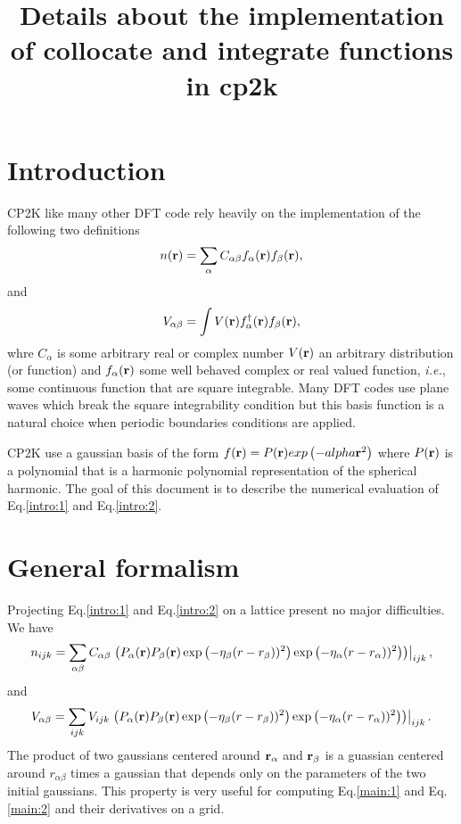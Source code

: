 \documentclass[prb]{revtex4}
\begin{document}
\title{Details about the implementation of collocate and integrate functions in cp2k}
\section{Introduction}
CP2K like many other DFT code rely heavily on the implementation of the following two definitions
\begin{equation}
  \label{intro:1}
  n({\bf r}) = \sum_{\alpha} C_{\alpha\beta} f_{\alpha}({\bf r}) f_{\beta}({\bf r}),
\end{equation}
and
\begin{equation}
  \label{intro:2}
  V_{\alpha\beta} = \int V({\bf r}) f^\dagger_\alpha({\bf r}) f_\beta({\bf r}),
\end{equation}
whre $C_{\alpha}$ is some arbitrary real or complex number $V({\bf r})$ an
arbitrary distribution (or function) and $f_\alpha({\bf r})$ some well behaved
complex or real valued function, {\it i.e.}, some continuous function that are
square integrable. Many DFT codes use plane waves which break the square
integrability condition but this basis function is a natural choice when
periodic boundaries conditions are applied.

CP2K use a gaussian basis of the form $f({\bf r}) = P({\bf r}) exp\left(-alpha
{\bf r}^2\right)$ where $P({\bf r})$ is a polynomial that is a harmonic polynomial
representation of the spherical harmonic. The goal of this document is to
describe the numerical evaluation of Eq.\ref{intro:1} and Eq.\ref{intro:2}.

\section{General formalism}
Projecting Eq.\ref{intro:1} and Eq.\ref{intro:2} on a lattice present no major difficulties.
We have
\begin{equation}
  \label{main:1}
  n_{ijk} = \sum_{\alpha\beta} C_{\alpha\beta} \left.\left(P_{\alpha}({\bf r})
  P_{\beta}({\bf r}) \exp\left(-\eta_{\beta} (r - r_{\beta}))^2\right)
  \exp\left(-\eta_{\alpha} (r - r_{\alpha}))^2\right)\right)\right| _{ijk},
\end{equation}
and
\begin{equation}
  \label{main:2}
  V_{\alpha\beta} = \sum_{ijk} V_{ijk} \left.\left(P_{\alpha}({\bf r})
  P_{\beta}({\bf r}) \exp\left(-\eta_{\beta} (r - r_{\beta}))^2\right)
  \exp\left(-\eta_{\alpha} (r - r_{\alpha}))^2\right)\right)\right| _{ijk}.
\end{equation}
The product of two gaussians centered around ${\bf r}_{\alpha}$ and ${\bf
  r}_{\beta}$ is a guassian centered around $r_{\alpha\beta}$ times a gaussian
that depends only on the parameters of the two initial gaussians. This property
is very useful for computing Eq.\ref{main:1} and Eq.\ref{main:2} and their
derivatives on a grid.
\end{document}
